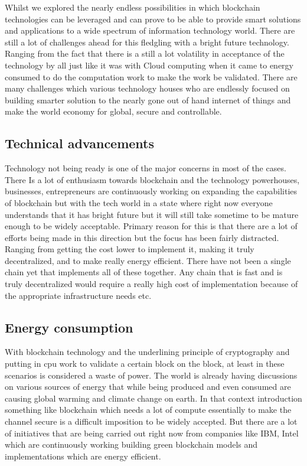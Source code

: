 Whilst we explored the nearly endless possibilities in which
blockchain technologies can be leveraged and can prove to be able to
provide smart solutions and applications to a wide spectrum of
information technology world. There are still a lot of challenges
ahead for this fledgling with a bright future technology. Ranging from
the fact that there is a still a lot volatility in acceptance of the
technology by all just like it was with Cloud computing when it came
to energy consumed to do the computation work to make the work be
validated. There are many challenges which various technology houses
who are endlessly focused on building smarter solution to the nearly
gone out of hand internet of things and make the world economy for
global, secure and controllable.

\subsection{Technical advancements}

Technology not being ready is one of the major concerns in most of the
cases. There Is a lot of enthusiasm towards blockchain and the
technology powerhouses, businesses, entrepreneurs are continuously
working on expanding the capabilities of blockchain but with the tech
world in a state where right now everyone understands that it has
bright future but it will still take sometime to be mature enough to
be widely acceptable. Primary reason for this is that there are a lot
of efforts being made in this direction but the focus has been fairly
distracted. Ranging from getting the cost lower to implement it,
making it truly decentralized, and to make really energy efficient.
There have not been a single chain yet that implements all of these
together. Any chain that is fast and is truly decentralized would
require a really high cost of implementation because of the
appropriate infrastructure needs etc.

\subsection{Energy consumption}

With blockchain technology and the underlining principle of
cryptography and putting in cpu work to validate a certain block on
the block, at least in these scenarios is considered a waste of power.
The world is already having discussions on various sources of energy
that while being produced and even consumed are causing global warming
and climate change on earth. In that context introduction something
like blockchain which needs a lot of compute essentially to make the
channel secure is a difficult imposition to be widely accepted. But
there are a lot of initiatives that are being carried out right now
from companies like IBM, Intel which are continuously working building
green blockchain models and implementations which are energy
efficient.


